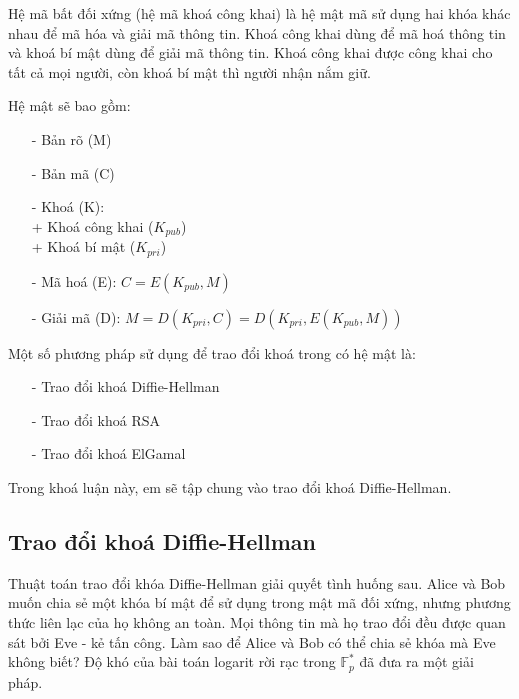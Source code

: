 Hệ mã bất đối xứng (hệ mã khoá công khai) là hệ mật mã sử dụng hai khóa khác nhau để mã hóa và giải mã thông tin.
Khoá công khai dùng để mã hoá thông tin và khoá bí mật dùng để giải mã thông tin. Khoá công khai được công khai 
cho tất cả mọi người, còn khoá bí mật thì người nhận nắm giữ.


Hệ mật sẽ bao gồm:
\begin{itemize}
    \item[-] Bản rõ (M)
    \item[-] Bản mã (C)
    \item[-] Khoá (K): 
        \\+ Khoá công khai ($K_{pub}$)
        \\+ Khoá bí mật ($K_{pri}$) 
    \item[-] Mã hoá (E): $C = E(K_{pub},M)$
    \item[-] Giải mã (D): $M = D(K_{pri},C) = D(K_{pri},E(K_{pub},M))$
\end{itemize}

Một số phương pháp sử dụng để trao đổi khoá trong có hệ mật là:
\begin{itemize}
    \item[-] Trao đổi khoá Diffie-Hellman
    \item[-] Trao đổi khoá RSA
    \item[-] Trao đổi khoá ElGamal
\end{itemize}

Trong khoá luận này, em sẽ tập chung vào trao đổi khoá Diffie-Hellman.
\subsection{Trao đổi khoá Diffie-Hellman}

Thuật toán trao đổi khóa Diffie-Hellman giải quyết tình huống sau. Alice và
Bob muốn chia sẻ một khóa bí mật để sử dụng trong mật mã đối xứng, nhưng
phương thức liên lạc của họ không an toàn. Mọi thông tin mà họ trao
đổi đều được quan sát bởi Eve - kẻ tấn công. Làm sao để Alice và Bob có
thể chia sẻ khóa mà Eve không biết? Độ khó của bài toán logarit rời
rạc trong $\mathbb{F}^*_p$ đã đưa ra một giải pháp.


